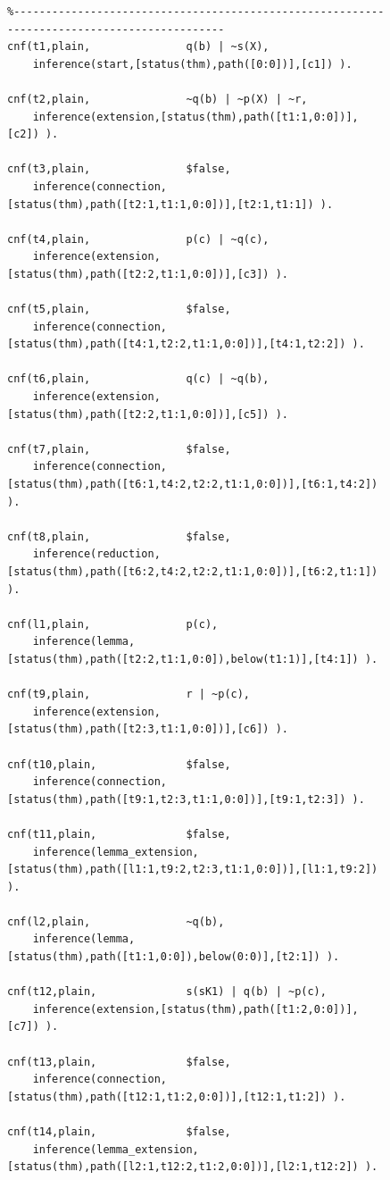 \documentclass[runningheads]{llncs}
\begin{document}
{\begin{figure}[h!]
\centering
{\scriptsize
{\setlength{\baselineskip}{3mm}
\begin{verbatim}
%--------------------------------------------------------------------------------------------
cnf(t1,plain,               q(b) | ~s(X),
    inference(start,[status(thm),path([0:0])],[c1]) ).

cnf(t2,plain,               ~q(b) | ~p(X) | ~r,
    inference(extension,[status(thm),path([t1:1,0:0])],[c2]) ).

cnf(t3,plain,               $false,
    inference(connection,[status(thm),path([t2:1,t1:1,0:0])],[t2:1,t1:1]) ).

cnf(t4,plain,               p(c) | ~q(c),
    inference(extension,[status(thm),path([t2:2,t1:1,0:0])],[c3]) ).

cnf(t5,plain,               $false,
    inference(connection,[status(thm),path([t4:1,t2:2,t1:1,0:0])],[t4:1,t2:2]) ).

cnf(t6,plain,               q(c) | ~q(b),
    inference(extension,[status(thm),path([t2:2,t1:1,0:0])],[c5]) ).

cnf(t7,plain,               $false,
    inference(connection,[status(thm),path([t6:1,t4:2,t2:2,t1:1,0:0])],[t6:1,t4:2]) ).

cnf(t8,plain,               $false,
    inference(reduction,[status(thm),path([t6:2,t4:2,t2:2,t1:1,0:0])],[t6:2,t1:1]) ).

cnf(l1,plain,               p(c),
    inference(lemma,[status(thm),path([t2:2,t1:1,0:0]),below(t1:1)],[t4:1]) ).

cnf(t9,plain,               r | ~p(c),
    inference(extension,[status(thm),path([t2:3,t1:1,0:0])],[c6]) ).

cnf(t10,plain,              $false,
    inference(connection,[status(thm),path([t9:1,t2:3,t1:1,0:0])],[t9:1,t2:3]) ).

cnf(t11,plain,              $false,
    inference(lemma_extension,[status(thm),path([l1:1,t9:2,t2:3,t1:1,0:0])],[l1:1,t9:2]) ).

cnf(l2,plain,               ~q(b),
    inference(lemma,[status(thm),path([t1:1,0:0]),below(0:0)],[t2:1]) ).

cnf(t12,plain,              s(sK1) | q(b) | ~p(c),
    inference(extension,[status(thm),path([t1:2,0:0])],[c7]) ).

cnf(t13,plain,              $false,
    inference(connection,[status(thm),path([t12:1,t1:2,0:0])],[t12:1,t1:2]) ).

cnf(t14,plain,              $false,
    inference(lemma_extension,[status(thm),path([l2:1,t12:2,t1:2,0:0])],[l2:1,t12:2]) ).


\end{verbatim}}}
\end{figure}}
\end{document}

